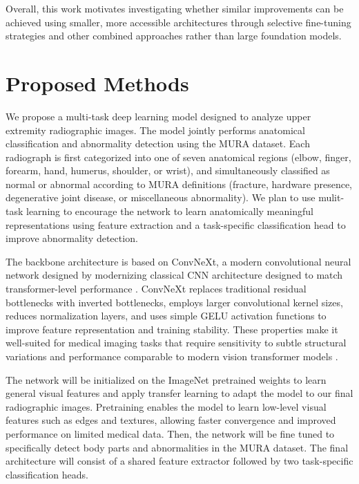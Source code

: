 \documentclass[conference]{IEEEtran}
\begin{document}
Overall, this work motivates investigating whether similar improvements can be achieved using smaller, more accessible architectures through selective fine-tuning strategies and other combined approaches rather than large foundation models.



\section{Proposed Methods}

We propose a multi-task deep learning model designed to analyze upper extremity radiographic images. The model jointly performs anatomical classification and abnormality detection using the MURA dataset. Each radiograph is first categorized into one of seven anatomical regions (elbow, finger, forearm, hand, humerus, shoulder, or wrist), and simultaneously classified as normal or abnormal according to MURA definitions (fracture, hardware presence, degenerative joint disease, or miscellaneous abnormality). We plan to use mulit-task learning to encourage the network to learn anatomically meaningful representations using feature extraction and a task-specific classification head to improve abnormality detection. 

The backbone architecture is based on ConvNeXt, a modern convolutional neural network designed by modernizing classical CNN architecture designed to match transformer-level performance \cite{liu2022convnet2020s}. ConvNeXt replaces traditional residual bottlenecks with inverted bottlenecks, employs larger convolutional kernel sizes, reduces normalization layers, and uses simple GELU activation functions to improve feature representation and training stability. These properties make it well-suited for medical imaging tasks that require sensitivity to subtle structural variations and performance comparable to modern vision transformer models \cite{touvron2021deit}.

The network will be initialized on the ImageNet pretrained weights to learn general visual features and apply transfer learning to adapt the model to our final radiographic images. Pretraining enables the model to learn low-level visual features such as edges and textures, allowing faster convergence and improved performance on limited medical data. Then, the network will be fine tuned to specifically detect body parts and abnormalities in the MURA dataset. The final architecture will consist of a shared feature extractor followed by two task-specific classification heads. 
\end{document}
